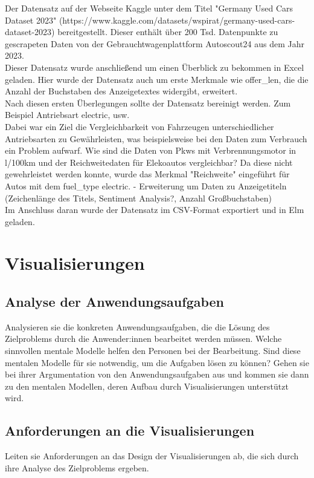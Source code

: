 \documentclass[usegeometry=true]{scrartcl}
\begin{document}
Der Datensatz auf der Webseite Kaggle unter dem Titel "Germany Used Cars Dataset 2023" (https://www.kaggle.com/datasets/wspirat/germany-used-cars-dataset-2023) bereitgestellt. Dieser enthält über 200 Tsd. Datenpunkte zu gescrapeten Daten von der Gebrauchtwagenplattform Autoscout24 aus dem Jahr 2023. \\
Dieser Datensatz wurde anschließend um einen Überblick zu bekommen in Excel geladen. Hier wurde der Datensatz auch um erste Merkmale wie offer_len, die die Anzahl der Buchstaben des Anzeigetextes widergibt, erweitert. \\
Nach diesen ersten Überlegungen sollte der Datensatz bereinigt werden. Zum Beispiel Antriebsart electric, usw.  \\
Dabei war ein Ziel die Vergleichbarkeit von Fahrzeugen unterschiedlicher Antriebsarten zu Gewährleisten, was beispielsweise bei den Daten zum Verbrauch ein Problem aufwarf. Wie sind die Daten von Pkws mit Verbrennungsmotor in l/100km und der Reichweitedaten für Elekoautos vergleichbar? Da diese nicht gewehrleistet werden konnte, wurde das Merkmal "Reichweite" eingeführt für Autos mit dem fuel_type electric.
- Erweiterung um Daten zu Anzeigetiteln (Zeichenlänge des Titels, Sentiment Analysis?, Anzahl Großbuchstaben) \\

Im Anschluss daran wurde der Datensatz im CSV-Format exportiert und in Elm geladen. \\

\section{Visualisierungen}

\subsection{Analyse der Anwendungsaufgaben}

Analysieren sie die konkreten Anwendungsaufgaben, die die Lösung des Zielproblems durch die Anwender:innen bearbeitet werden müssen. 
Welche sinnvollen mentale Modelle helfen den Personen bei der Bearbeitung. 
Sind diese mentalen Modelle für sie notwendig, um die Aufgaben lösen zu können? Gehen sie bei ihrer Argumentation von den Anwendungsaufgaben aus und kommen sie dann zu den mentalen Modellen, deren Aufbau durch Visualisierungen unterstützt wird. 
\subsection{Anforderungen an die Visualisierungen}
Leiten sie Anforderungen an das Design der Visualisierungen ab, die sich durch ihre Analyse des Zielproblems ergeben.
\end{document}
